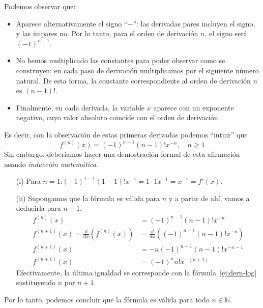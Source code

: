 \begin{ejemplo}
Podemos observar que:
\begin{itemize}
\item
Aparece alternativamente el signo ``$-$'': las derivadas pares incluyen el signo, y las impares no. Por lo tanto, para el orden de derivación $n$, el signo será  $(-1)^{n-1}$.
\item
No hemos multiplicado las constantes para poder observar como se construyen: en cada paso de derivación multiplicamos por el siguiente número natural.
De esta forma, la constante correspondiente al orden de derivación $n$ es $(n-1)!$.
\item
Finalmente, en cada derivada, la variable $x$ aparece con un exponente negativo, cuyo valor absoluto coincide con el orden de derivación.
\end{itemize}
Es decir, con la observación de estas primeras derivadas podemos ``intuir'' que
\begin{equation}\label{ej:dern-log}
f^{(n)}(x)= (-1)^{n-1}(n-1)!x^{-n},\quad n\ge 1
\end{equation}
Sin embargo, deberíamos hacer una demostración formal de esta afirmación usando \emph{inducción matemática}.
\begin{itemize}
\item[(i)]
Para $n=1$:\quad $(-1)^{1-1}(1-1)!x^{-1}=1\cdot 1 x^{-1} = x^{-1}=f'(x)$.
\item[(ii)]
Supongamos que la fórmula es válida para $n$ y a partir de ahí, vamos a deducirla para $n+1$.
\begin{align*}
f^{(n)}(x) &= (-1)^{n-1}(n-1)!x^{-n} \\
f^{(n+1)}(x) =\frac{d}{dx}(f^{(n)}(x)) &=\frac{d}{dx}\left((-1)^{n-1}(n-1)!x^{-n}\right)\\
f^{(n+1)}(x) &= -n(-1)^{n-1}(n-1)!x^{-n-1}\\
f^{(n+1)}(x) &= (-1)^{n}n!x^{-(n+1)}
\end{align*}
Efectivamente, la última igualdad se corresponde con la fórmula~\eqref{ej:dern-log} sustituyendo $n$ por $n+1$.
\end{itemize}
Por lo tanto, podemos concluir que la fórmula es válida para todo $n\in\mathbb{N}$.


\end{ejemplo}
